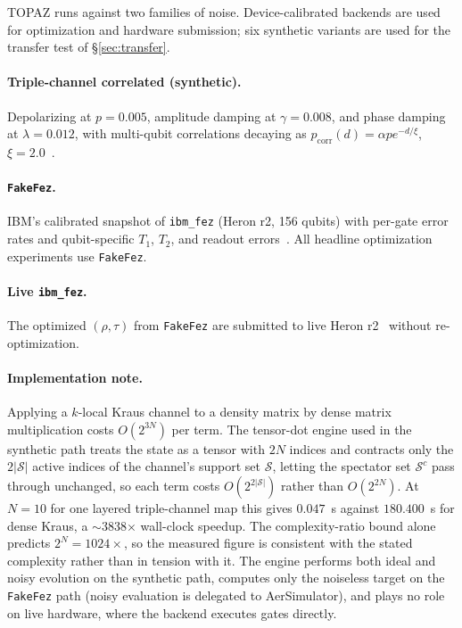 \documentclass[twocolumn,aps,prl,superscriptaddress,showkeys]{revtex4-2}
\theoremstyle{plain}
\theoremstyle{definition}
\newcommand{\ibmfez}{\texttt{ibm\_fez}}
\newcommand{\fakefez}{\texttt{FakeFez}}
\begin{document}
TOPAZ runs against two families of noise. Device-calibrated backends are used for optimization and hardware submission; six synthetic variants are used for the transfer test of \S\ref{sec:transfer}.

\paragraph{Triple-channel correlated (synthetic).}
Depolarizing at $p=0.005$, amplitude damping at $\gamma=0.008$, and phase damping at $\lambda=0.012$, with multi-qubit correlations decaying as $p_{\mathrm{corr}}(d)=\alpha p e^{-d/\xi}$, $\xi=2.0$~\cite{Kraus1983}.

\paragraph{\fakefez.}
IBM's calibrated snapshot of \ibmfez{} (Heron r2, 156 qubits) with per-gate error rates and qubit-specific $T_1$, $T_2$, and readout errors~\cite{McKay2020}. All headline optimization experiments use \fakefez{}.

\paragraph{Live \ibmfez.}
The optimized $(\rho,\tau)$ from \fakefez{} are submitted to live Heron r2~\cite{IBMHeron2024} without re-optimization.

\paragraph{Implementation note.}
\label{par:engine}
Applying a $k$-local Kraus channel to a density matrix by dense matrix multiplication costs $O(2^{3N})$ per term. The tensor-dot engine used in the synthetic path treats the state as a tensor with $2N$ indices and contracts only the $2|\mathcal S|$ active indices of the channel's support set $\mathcal S$, letting the spectator set $\mathcal S^c$ pass through unchanged, so each term costs $O(2^{2|\mathcal S|})$ rather than $O(2^{2N})$. At $N=10$ for one layered triple-channel map this gives $0.047$~s against $180.400$~s for dense Kraus, a $\sim$3838$\times$ wall-clock speedup. The complexity-ratio bound alone predicts $2^{N}=1024\times$, so the measured figure is consistent with the stated complexity rather than in tension with it. The engine performs both ideal and noisy evolution on the synthetic path, computes only the noiseless target on the \fakefez{} path (noisy evaluation is delegated to AerSimulator), and plays no role on live hardware, where the backend executes gates directly.
\end{document}
